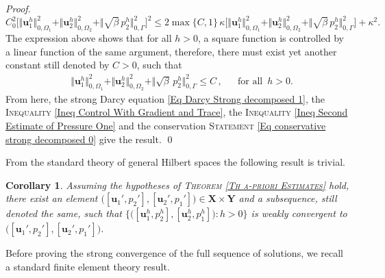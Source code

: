 \documentclass[3p]{elsarticle}
\newtheorem{corollary}[theorem]{Corollary}
\def\X{\mathbf X}
\def\Y{\mathbf Y}
\def\uone{\mathbf{u}_{1}}
\def\uoneh{\mathbf{u}_{1}^{h}}
\def\utwo{\mathbf{u}_{2}}
\def\utwoh{\mathbf{u}_{2}^{h}}
\def\pone{p_{1}}
\def\poneh{p_{1}^{h}}
\def\ptwo{p_{2}}
\def\ptwoh{p_{2}^{h}}
\def\Omeone{\Omega_{1}}
\def\Ometwo{\Omega_{2}}
\begin{document}
\begin{proof}
%
\begin{equation*} %
C^{2}_{0} \Big[\Vert \uoneh \Vert^{2}_{0, \Omeone} 
+ \Vert \utwoh \Vert^{2}_{0, \Ometwo}  
+ \Vert \sqrt{\beta} \, \ptwoh \Vert^{2} _{0, \Gamma}
\Big]^{2} %
%
\leq 2 \max\{   C ,  1 \}\, \kappa
\Big[
\Vert \uoneh\Vert_{0, \Omeone}^{2} 
+ \Vert \utwoh\Vert_{0, \Ometwo}^{2}
+ \Vert \sqrt{\beta} \, \ptwoh\Vert_{0, \Gamma}^{2} \Big]
+ \kappa^{2}.
\end{equation*}
%
The expression above shows that for all $h > 0$, a square function is controlled by a linear function of the same argument, therefore, there must exist yet another constant still denoted by $C>0$, such that
%
%
\begin{align*} %
& \Vert \uoneh \Vert^{2}_{0, \Omeone} 
+ \Vert \utwoh \Vert^{2}_{0,\Ometwo}  
+ \Vert \sqrt{\beta} \, \ptwoh \Vert^{2} _{0, \Gamma}
 \leq C \,,  &
& \text{for all }\, h> 0 .
\end{align*}
%
%
From here, the strong Darcy equation \eqref{Eq Darcy Strong decomposed 1}, the \textsc{Inequality} \eqref{Ineq Control With Gradient and Trace}, the \textsc{Inequality} \eqref{Ineq Second Estimate of Pressure One} and the conservation \textsc{Statement} \eqref{Eq conservative strong decomposed 0} give the result.
%
%
%
\qed
\end{proof}
%
%
From the standard theory of general Hilbert spaces the following result is trivial.
%
%
\begin{corollary}\label{Th Weak Convergence of Solutions}
Assuming the hypotheses of \textsc{Theorem \ref{Th a-priori Estimates}} hold, there exist an element $\big([\uone', \ptwo'],[\utwo', \pone']\big)\in \X\times \Y$ and a subsequence, still denoted the same, such that $\big\{\big([\uoneh, \ptwoh],[\utwoh, \poneh]\big): h>0\}$ is weakly convergent to $ \big([\uone', \ptwo'],[\utwo', \pone']\big) $.
\end{corollary}
%
%
Before proving the strong convergence of the full sequence of solutions, we recall a standard finite element theory result.
%
%
\end{document}
